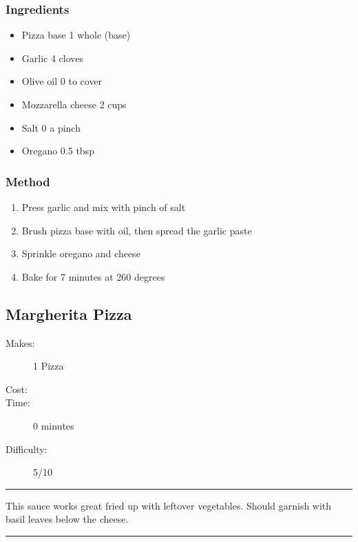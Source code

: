 \documentclass[]{article}
\begin{document}
\subsubsection*{\Large Ingredients}
\begin{multicols}{2}
\begin{itemize}
 \item Pizza base \hfill 1 whole (base)
 \item Garlic \hfill 4 cloves
 \item Olive oil \hfill 0 to cover
 \item Mozzarella cheese \hfill 2 cups
 \item Salt \hfill 0 a pinch
 \item Oregano \hfill 0.5 tbsp
\end{itemize}
\end{multicols}
\subsubsection*{\Large Method}
\begin{enumerate}[font=\huge\color{accent}]
	\item Press garlic and mix with pinch of salt
	\item Brush pizza base with oil, then spread the garlic paste
	\item Sprinkle oregano and cheese
	\item Bake for 7 minutes at 260 degrees
\end{enumerate}
\newpage
{}\label{rec:Margherita Pizza}
\subsection*{\center\huge Margherita Pizza}
\begin{description}
\item[Makes:] 1 Pizza
\item[Cost:] \textdollar
\item[Time:] 0 minutes
\item[Difficulty:] 5/10
\end{description}
\vspace{0.2cm}\hrule\vspace{0.5cm}
\begin{adjustwidth}{0.5 cm}{0.5 cm}

This sauce works great fried up with leftover vegetables. Should garnish with basil leaves below the cheese. \hfill{}\color{black}

\end{adjustwidth}
\vspace{0.5cm}\hrule
\end{document}
